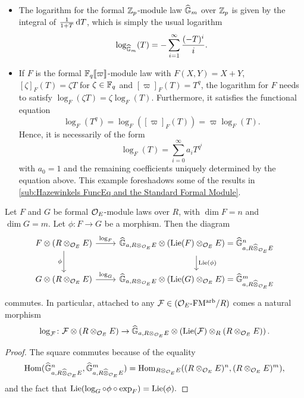 \documentclass[../main.tex]{subfiles}
\begin{document}
\begin{xpl} \leavevmode
  \begin{itemize}
    \item The logarithm for the formal $\mathbb{Z}_p$-module law $\widehat{\mathbb{G}}_m$ over 
      $\mathbb{Z}_p$ is given by the integral of $\frac{1}{1+T} \, \mathrm{d} T$, which is 
      simply the usual logarithm
      \begin{equation*}
        \log_{\widehat{\mathbb{G}}_m}(T) = - \sum_{i = 1}^\infty \frac{(-T)^{i}}i. 
      \end{equation*}
    \item If $F$ is the formal $\mathbb{F}_q\llbracket \varpi \rrbracket$-module law with $F(X,Y) = X+Y$,
      $[\zeta]_F(T) = \zeta T$ for $\zeta \in \mathbb{F}_q$ and $[\varpi]_F(T) = T^q$, 
      the logarithm for $F$ needs to satisfy $\log_F(\zeta T) = \zeta \log_F(T)$.
      Furthermore, it satisfies the functional equation
            \begin{equation*}
         \log_F(T^q) = \log_F([\varpi]_F(T)) = \varpi \log_F(T).
      \end{equation*}
      Hence, it is necessarily of the form
      \begin{equation*}
        \log_F(T) = \sum_{i=0}^\infty a_i T^{q^i}
      \end{equation*}
      with $a_0 = 1$ and the remaining coefficients uniquely determined by the 
      equation above.
      This example foreshadows some of the results in \cref{sub:Hazewinkels
      FuncEq and the Standard Formal Module}.
  \end{itemize}
\end{xpl}

\begin{lem}
  Let $F$ and $G$ be formal ${\mathcal{O}_E}$-module laws over $R$, with $\dim F = n$ and
  $\dim G = m$. 
  Let $\phi\colon  F \to G$ be a morphism. Then the diagram 
  \begin{equation*}
  \begin{tikzcd}[ampersand replacement=\&]
    {F \otimes(R \otimes_{\cO_E} E)} \& {\Ghat_{a, R\otimes_{\cO_E} E} \otimes (\Lie(F)}
    \otimes_{\cO_E} E) =
    \Ghat_{a, R\cotimes_{\cO_E}E}^n \\
    {G \otimes(R \otimes_{\cO_E} E)} \& {\Ghat_{a, R\otimes_{\cO_E} E} \otimes (\Lie(G)} \otimes_{\cO_E} E) =
    \Ghat_{a, R\cotimes_{\cO_E}E}^m
  	\arrow["{\log_F}", from=1-1, to=1-2]
  	\arrow["\phi"', from=1-1, to=2-1]
  	\arrow["{\Lie(\phi)}", from=1-2, to=2-2]
  	\arrow["{\log_G}", from=2-1, to=2-2]
  \end{tikzcd}
  \end{equation*}
  commutes. In particular, attached to any $\mathcal{F} \in {({\mathcal{O}_E}\textnormal-\allowbreak\mathrm{FM^{arb}}/{R})}$ comes a 
  natural morphism 
  $$\log_{\mathcal{F}}\colon  \mathcal{F} \otimes (R \otimes_{\mathcal{O}_E} E) \to \widehat{\mathbb{G}}_{a, R\otimes_{\mathcal{O}_E} E} \otimes
  \left(\operatorname{Lie}(\mathcal{F}) \otimes_R (R \otimes_{\mathcal{O}_E} E)\right).$$
  \begin{proof}
    The square commutes because of the equality
    $$\operatorname{Hom}(\widehat{\mathbb{G}}_{a, R\widehat \otimes_{\mathcal{O}_E}E}^n, \widehat{\mathbb{G}}_{a, R\widehat \otimes_{\mathcal{O}_E}E}^m) = \operatorname{Hom}_{R \otimes_{\mathcal{O}_E} E}((R\otimes_{\mathcal{O}_E} E)^n, (R\otimes_{\mathcal{O}_E} E)^m),$$
    and the fact that $\operatorname{Lie}(\log_G \circ \phi \circ \exp_F) = \operatorname{Lie}(\phi).$
  \end{proof}
\end{lem}
\end{document}
